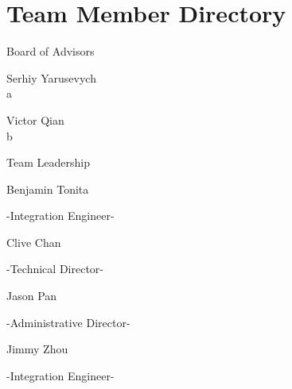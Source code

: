 \documentclass{report}
\begin{document}
    \section{Team Member Directory}
    \begin{center}
        \textsf{Board of Advisors}
    \end{center}
    \begin{multicols}{2}
        \begin{center}
            Serhiy Yarusevych\\
            a\\
        \end{center}
        \columnbreak
        \begin{center}
            Victor Qian\\
            b
        \end{center}
    \end{multicols}
    \begin{center}
        \textsf{Team Leadership}
    \end{center}
    \begin{multicols}{4}
        \begin{center}
            Benjamin Tonita\\
            \begin{small}
                -Integration Engineer-\\
            \end{small}
        \end{center}
        \columnbreak    \begin{center}
            Clive Chan\\
            \begin{small}
                -Technical Director-\\
            \end{small}
        \end{center}
        \columnbreak    \begin{center}
            Jason Pan\\
            \begin{small}
                -Administrative Director-\\
            \end{small}
        \end{center}
        \columnbreak
        \begin{center}
            Jimmy Zhou\\
            \begin{small}
                -Integration Engineer-
            \end{small}
        \end{center}
    \end{multicols}
\end{document}
